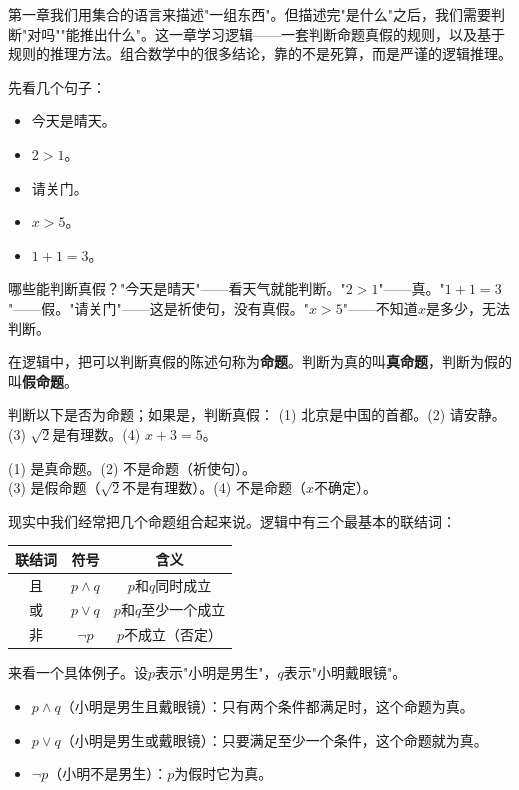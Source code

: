 
第一章我们用集合的语言来描述"一组东西"。但描述完"是什么"之后，我们需要判断"对吗""能推出什么"。这一章学习逻辑——一套判断命题真假的规则，以及基于规则的推理方法。组合数学中的很多结论，靠的不是死算，而是严谨的逻辑推理。


先看几个句子：
\begin{itemize}
\item 今天是晴天。
\item $2>1$。
\item 请关门。
\item $x>5$。
\item $1+1=3$。
\end{itemize}

哪些能判断真假？"今天是晴天"——看天气就能判断。"$2>1$"——真。"$1+1=3$"——假。"请关门"——这是祈使句，没有真假。"$x>5$"——不知道$x$是多少，无法判断。

在逻辑中，把可以判断真假的陈述句称为\textbf{命题}。判断为真的叫\textbf{真命题}，判断为假的叫\textbf{假命题}。

\begin{example}
判断以下是否为命题；如果是，判断真假：
(1) 北京是中国的首都。\qquad (2) 请安静。\\
(3) $\sqrt2$是有理数。\qquad (4) $x+3=5$。
\end{example}
\begin{solution}
(1) 是真命题。\qquad (2) 不是命题（祈使句）。\\
(3) 是假命题（$\sqrt2$不是有理数）。\qquad (4) 不是命题（$x$不确定）。
\end{solution}

现实中我们经常把几个命题组合起来说。逻辑中有三个最基本的联结词：

\begin{center}
\begin{tabular}{c|c|c}
联结词 & 符号 & 含义 \\ \hline
且 & $p\land q$ & $p$和$q$同时成立 \\
或 & $p\lor q$ & $p$和$q$至少一个成立 \\
非 & $\lnot p$ & $p$不成立（否定）
\end{tabular}
\end{center}

来看一个具体例子。设$p$表示"小明是男生"，$q$表示"小明戴眼镜"。
\begin{itemize}
\item $p\land q$（小明是男生且戴眼镜）：只有两个条件都满足时，这个命题为真。
\item $p\lor q$（小明是男生或戴眼镜）：只要满足至少一个条件，这个命题就为真。
\item $\lnot p$（小明不是男生）：$p$为假时它为真。
\end{itemize}

